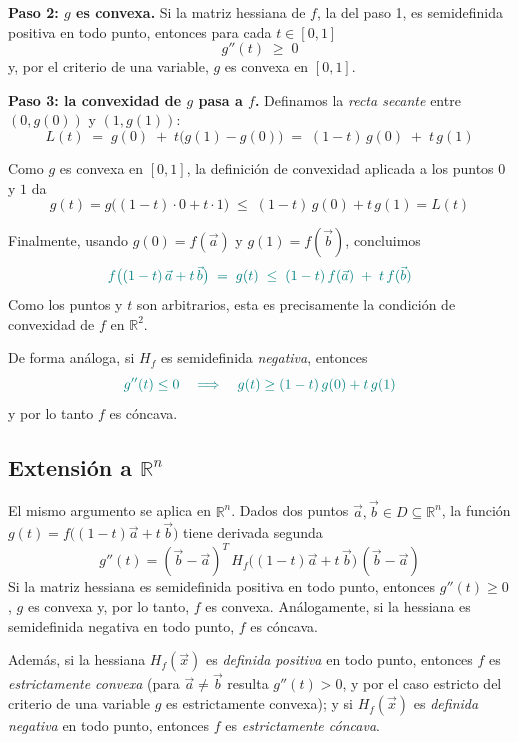 \documentclass{article}
\newcommand{\R}{\ensuremath{\mathbb{R}}}
\newcommand{\vect}[1]{\vec{#1}}
\begin{document}
\medskip
\noindent\textbf{Paso 2: \(g\) es convexa.} Si la matriz hessiana de \(f\), la del paso 1, es semidefinida positiva en todo punto, entonces para cada \(t\in[0,1]\)
\[
g''(t)\;\ge\;0
\]
y, por el criterio de una variable, \(g\) es convexa en \([0,1]\).

\medskip
\noindent\textbf{Paso 3: la convexidad de \(g\) pasa a \(f\).} Definamos la \emph{recta secante} entre \((0,g(0))\) y \((1,g(1))\):
\[
L(t) \;=\; g(0)\;+\;t\bigl(g(1)-g(0)\bigr)
\;=\;(1-t)\,g(0) \;+\; t\,g(1)
\]

Como \(g\) es convexa en \([0,1]\), la definición de convexidad aplicada a los puntos \(0\) y \(1\) da
\[
g(t)=g\bigl((1-t)\cdot0+t\cdot1\bigr)\;\le\;(1-t)\,g(0)+t\,g(1)=L(t)
\]

Finalmente, usando \(g(0)=f(\vect{a})\) y \(g(1)=f(\vect{b})\), concluimos
\[
\color{teal}
f\bigl((1-t)\,\vect{a}+t\,\vect{b}\bigr)
\;=\;g(t)
\;\le\;
(1-t)\,f(\vect{a}) \;+\; t\,f(\vect{b})
\]
Como los puntos y \(t\) son arbitrarios, esta es precisamente la condición de convexidad de \(f\) en \(\R^2\).

De forma análoga, si \(H_f\) es semidefinida \emph{negativa}, entonces
\[
\color{teal}
g''(t)\le0
\quad\Longrightarrow\quad
g(t)\ge(1-t)\,g(0)+t\,g(1)
\]
y por lo tanto \(f\) es cóncava.

\subsection*{Extensión a $\R^n$}
El mismo argumento se aplica en \(\R^n\). Dados dos puntos \(\vect{a},\vect{b}\in D\subseteq\R^n\), la función \(g(t)=f\bigl((1-t)\vect{a}+t\,\vect{b}\bigr)\) tiene derivada segunda
\[
g''(t)=(\vect{b}-\vect{a})^{T}\,H_f\bigl((1-t)\vect{a}+t\,\vect{b}\bigr)\,(\vect{b}-\vect{a})
\]
Si la matriz hessiana es semidefinida positiva en todo punto, entonces \(g''(t)\ge0\), \(g\) es convexa y, por lo tanto, \(f\) es convexa. Análogamente, si la hessiana es semidefinida negativa en todo punto, \(f\) es cóncava.

\noindent Además, si la hessiana \(H_f(\vect{x})\) es \emph{definida positiva} en todo punto, entonces \(f\) es \emph{estrictamente convexa} (para \(\vect{a}\neq\vect{b}\) resulta \(g''(t)>0\), y por el caso estricto del criterio de una variable \(g\) es estrictamente convexa); y si \(H_f(\vect{x})\) es \emph{definida negativa} en todo punto, entonces \(f\) es \emph{estrictamente cóncava}.
\end{document}

